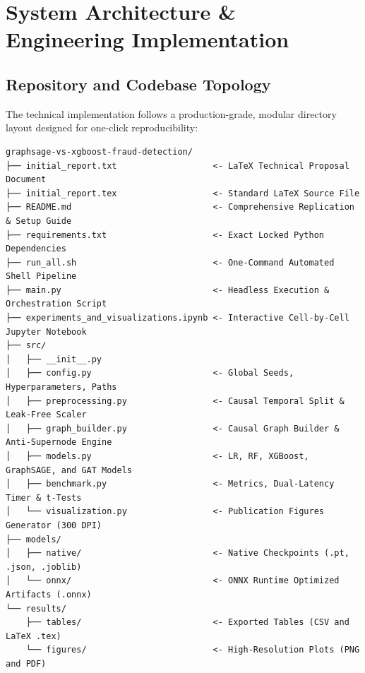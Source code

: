 \documentclass[11pt,a4paper]{article}
\begin{document}
\section{System Architecture \& Engineering Implementation}

\subsection{Repository and Codebase Topology}
The technical implementation follows a production-grade, modular directory layout designed for one-click reproducibility:

\begin{verbatim}
graphsage-vs-xgboost-fraud-detection/
├── initial_report.txt                   <- LaTeX Technical Proposal Document
├── initial_report.tex                   <- Standard LaTeX Source File
├── README.md                            <- Comprehensive Replication & Setup Guide
├── requirements.txt                     <- Exact Locked Python Dependencies
├── run_all.sh                           <- One-Command Automated Shell Pipeline
├── main.py                              <- Headless Execution & Orchestration Script
├── experiments_and_visualizations.ipynb <- Interactive Cell-by-Cell Jupyter Notebook
├── src/
│   ├── __init__.py
│   ├── config.py                        <- Global Seeds, Hyperparameters, Paths
│   ├── preprocessing.py                 <- Causal Temporal Split & Leak-Free Scaler
│   ├── graph_builder.py                 <- Causal Graph Builder & Anti-Supernode Engine
│   ├── models.py                        <- LR, RF, XGBoost, GraphSAGE, and GAT Models
│   ├── benchmark.py                     <- Metrics, Dual-Latency Timer & t-Tests
│   └── visualization.py                 <- Publication Figures Generator (300 DPI)
├── models/
│   ├── native/                          <- Native Checkpoints (.pt, .json, .joblib)
│   └── onnx/                            <- ONNX Runtime Optimized Artifacts (.onnx)
└── results/
    ├── tables/                          <- Exported Tables (CSV and LaTeX .tex)
    └── figures/                         <- High-Resolution Plots (PNG and PDF)
\end{verbatim}
\end{document}
